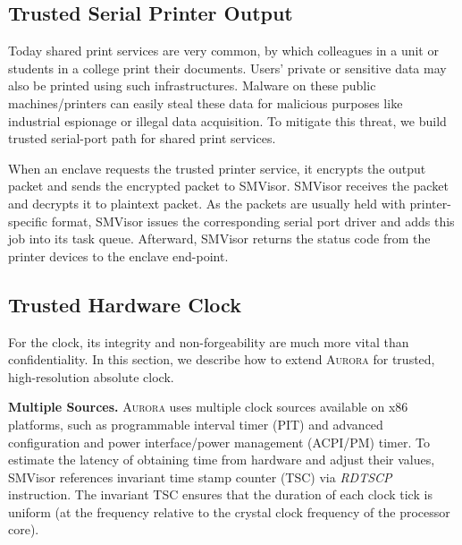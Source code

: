 \subsection{Trusted Serial Printer Output}\label{output_service}
Today shared print services are very common, by which colleagues in a unit or students in a college print their documents. Users' private or sensitive data may also be printed using such infrastructures. Malware on these public machines/printers can easily steal these data for malicious purposes like industrial espionage or illegal data acquisition. To mitigate this threat, we build trusted serial-port path for shared print services.

When an enclave requests the trusted printer service, it encrypts the output packet and sends the encrypted packet to SMVisor.  SMVisor receives the packet and decrypts it to plaintext packet. As the packets are usually held with printer-specific format, SMVisor issues the corresponding serial port driver and adds this job into its task queue. Afterward, SMVisor returns the status code from the printer devices to the enclave end-point.

\subsection{Trusted Hardware Clock}\label{time service}
For the clock, its integrity and non-forgeability are much more vital than confidentiality. %
In this section, we describe how to extend \textsc{Aurora} for trusted, high-resolution absolute clock. %

\textbf{Multiple Sources.}
\textsc{Aurora} uses multiple clock sources available on x86 platforms, such as programmable interval timer (PIT) and advanced configuration and power interface/power management (ACPI/PM) timer. To estimate the latency of obtaining time from hardware and adjust their values, SMVisor references invariant time stamp counter (TSC) via \textit{RDTSCP} instruction. The invariant TSC ensures that the duration of each clock tick is uniform (at the frequency relative to the crystal clock frequency of the processor core).

